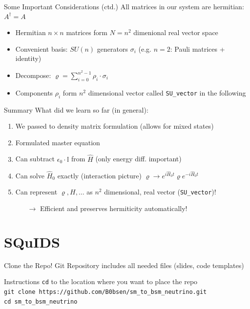 \documentclass[]{beamer}
\begin{document}
\begin{frame}{Some Important Considerations (ctd.)}
  All matrices in our system are hermitian: \(A^\dagger = A\)
  \begin{itemize}
    \item Hermitian \(n \times n\) matrices form \(N = n^2\) dimenional real vector space
    \item Convenient basis: \(SU(n)\) generators \(\sigma_i\) (e.g. \(n = 2\): Pauli matrices + identity)
    \item Decompose: \(\varrho = \sum_{i = 0}^{n^2 - 1} \rho_i \cdot \sigma_i\)
    \item Components \(\rho_i\) form \(n^2\) dimensional vector called \texttt{SU\_vector} in the following
  \end{itemize}
\end{frame}

\begin{frame}{Summary}
  What did we learn so far (in general):
  \begin{enumerate}
    \item We passed to density matrix formulation (allows for mixed states)
    \item Formulated master equation
    \item Can subtract \(\epsilon_0 \cdot \mathbb{I}\) from \(\hat{H}\) (only energy diff. important)
    \item Can solve \(\hat{H}_0\) exactly (interaction picture) \(\varrho \rightarrow e^{i\hat{H}_0 t} \varrho e^{- i\hat{H}_0 t}\)
    \item Can represent \(\varrho, H, \ldots\) as \(n^2\) dimensional, real vector (\texttt{SU\_vector})!
    \begin{itemize}
      \item[\(\rightarrow\)] Efficient and preserves hermiticity automatically!
    \end{itemize}
  \end{enumerate}
\end{frame}

\section{SQuIDS}

\begin{frame}
\end{frame}

\begin{frame}{Clone the Repo!}
  Git Repository includes all needed files (slides, code templates)
  \begin{block}{Instructions}
    \texttt{cd} to the location where you want to place the repo \\
    \texttt{git clone https://github.com/B0bsen/sm\_to\_bsm\_neutrino.git} \\
    \texttt{cd sm\_to\_bsm\_neutrino}
  \end{block}
\end{frame}
\end{document}
